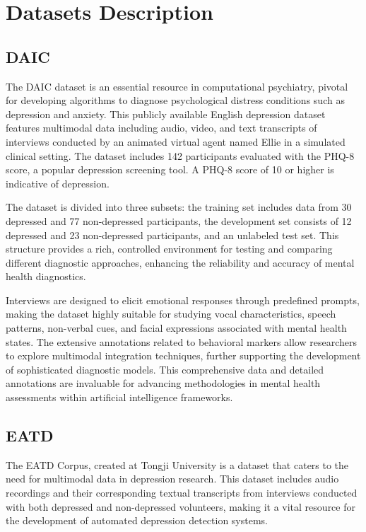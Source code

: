 \section{Datasets Description}
\subsection{DAIC}
The DAIC dataset is an essential resource in computational psychiatry, pivotal for developing algorithms to diagnose psychological distress conditions such as depression and anxiety. This publicly available English depression dataset features multimodal data including audio, video, and text transcripts of interviews conducted by an animated virtual agent named Ellie in a simulated clinical setting. The dataset includes 142 participants evaluated with the PHQ-8 score, a popular depression screening tool. A PHQ-8 score of 10 or higher is indicative of depression.

The dataset is divided into three subsets: the training set includes data from 30 depressed and 77 non-depressed participants, the development set consists of 12 depressed and 23 non-depressed participants, and an unlabeled test set. This structure provides a rich, controlled environment for testing and comparing different diagnostic approaches, enhancing the reliability and accuracy of mental health diagnostics.

Interviews are designed to elicit emotional responses through predefined prompts, making the dataset highly suitable for studying vocal characteristics, speech patterns, non-verbal cues, and facial expressions associated with mental health states. The extensive annotations related to behavioral markers allow researchers to explore multimodal integration techniques, further supporting the development of sophisticated diagnostic models. This comprehensive data and detailed annotations are invaluable for advancing methodologies in mental health assessments within artificial intelligence frameworks.

\subsection{EATD}
The EATD Corpus, created at Tongji University is a dataset that caters to the need for multimodal data in depression research. This dataset includes audio recordings and their corresponding textual transcripts from interviews conducted with both depressed and non-depressed volunteers, making it a vital resource for the development of automated depression detection systems.

